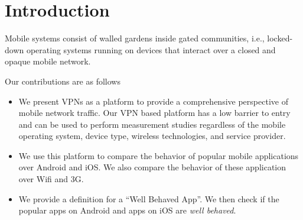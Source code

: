 \section{Introduction}
\label{sec:introduction}

Mobile systems consist of walled gardens inside gated communities, i.e., locked-down operating systems running on devices that interact over a closed and opaque mobile network. 

Our contributions are as follows
\begin{itemize}
\item We present VPNs as a platform to provide a comprehensive perspective of mobile network traffic. 
Our VPN based platform has a low barrier to entry and can be used to perform measurement studies regardless of the mobile operating system, device type, wireless technologies, and service provider.    
\item We use this platform to compare the behavior of popular mobile applications over Android and iOS. 
We also compare the behavior of these application over Wifi and 3G. 
\item We provide a definition for a ``Well Behaved App''. 
We then check if the  popular apps on Android and  apps on iOS are \emph{well behaved}.
\end{itemize}



